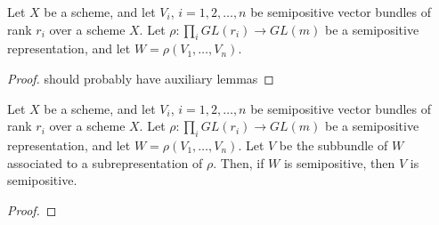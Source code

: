 \begin{lemma}
Let $X$ be a scheme, and let $V_i$, $i=1,2,\ldots,n$ be semipositive vector bundles of rank $r_i$ over a scheme $X$. Let $\rho:\prod_i GL(r_i)\to GL(m)$ be a semipositive representation, and let $W=\rho(V_1,\ldots,V_n)$. 
\end{lemma}

\begin{proof}
should probably have auxiliary lemmas
\end{proof}

\begin{lemma}
Let $X$ be a scheme, and let $V_i$, $i=1,2,\ldots,n$ be semipositive vector bundles of rank $r_i$ over a scheme $X$. Let $\rho:\prod_i GL(r_i)\to GL(m)$ be a semipositive representation, and let $W=\rho(V_1,\ldots,V_n)$. Let $V$ be the subbundle of $W$ associated to a subrepresentation of $\rho$. Then, if $W$ is semipositive, then $V$ is semipositive.
\end{lemma}

\begin{proof}

\end{proof}








